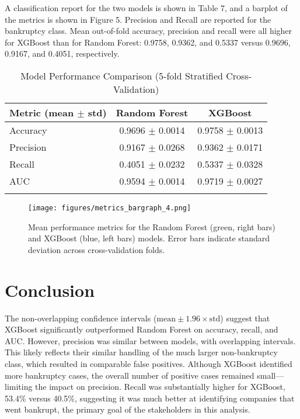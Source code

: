 \documentclass{article}      %
\begin{document}
A classification report for the two models is shown in Table 7, and a barplot of the metrics is shown in Figure 5. Precision and Recall are reported for the bankruptcy class. Mean out-of-fold accuracy, precision and recall were all higher for XGBoost than for Random Forest: 0.9758, 0.9362, and 0.5337 versus 0.9696, 0.9167, and 0.4051, respectively.

\begin{table}[ht]
    \centering
    \caption{Model Performance Comparison (5-fold Stratified Cross-Validation)}
    \begin{tabular}{l|c|c}
    \arrayrulecolor{black}  %
    \toprule
    \textbf{Metric (mean $\pm$ std)} & \textbf{Random Forest} & \textbf{XGBoost} \\
    \midrule
    \arrayrulecolor{lightgray}
    Accuracy & 0.9696 $\pm$ 0.0014 & 0.9758 $\pm$ 0.0013 \\
    \hline
    Precision & 0.9167 $\pm$ 0.0268 & 0.9362 $\pm$ 0.0171 \\
    \hline
    Recall & 0.4051 $\pm$ 0.0232 & 0.5337 $\pm$ 0.0328 \\
    \hline
    AUC & 0.9594 $\pm$ 0.0014 & 0.9719 $\pm$ 0.0027 \\
    \arrayrulecolor{black}
    \bottomrule
    \end{tabular}
    \label{table:metrics}
\end{table}

\begin{figure}[!h]
	\centering
	\texttt{[image: figures/metrics\_bargraph\_4.png]}
	\caption{Mean performance metrics for the Random Forest (green, right bars) and XGBoost (blue, left bars) models. Error bars indicate standard deviation across cross-validation folds.}
	\label{fig:metrics_bargraph}
\end{figure}

\section{Conclusion}

The non-overlapping confidence intervals ($\text{mean} \pm 1.96 \times \text{std}$) suggest that XGBoost significantly outperformed Random Forest on accuracy, recall, and AUC. However, precision was similar between models, with overlapping intervals. This likely reflects their similar handling of the much larger non-bankruptcy class, which resulted in comparable false positives. Although XGBoost identified more bankruptcy cases, the overall number of positive cases remained small---limiting the impact on precision. Recall was substantially higher for XGBoost, 53.4\% versus 40.5\%, suggesting it was much better at identifying companies that went bankrupt, the primary goal of the stakeholders in this analysis.
\end{document}
